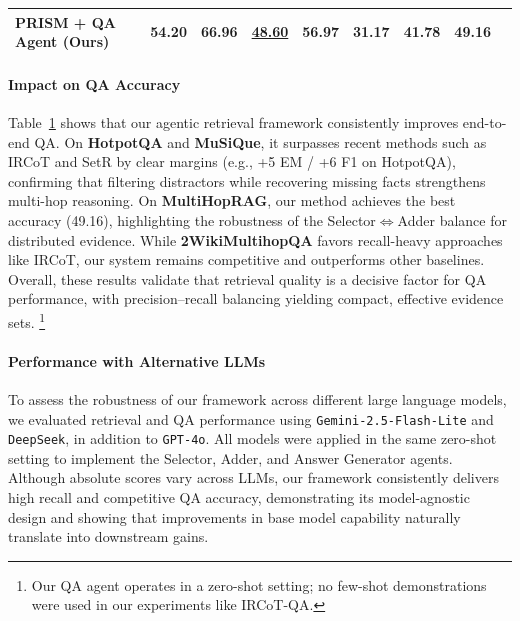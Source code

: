 \documentclass{article} %
\begin{document}
\begin{table}[ht]
\begin{tabular}{l|cc|cc|cc|cc}
\textbf{PRISM + QA Agent (Ours)} & \textbf{54.20} & \textbf{66.96} & \underline{48.60} & {56.97} & \textbf{31.17} & \textbf{41.78} & \textbf{49.16} \\
\bottomrule
\end{tabular}
\label{tab:qa}
\end{table}



\paragraph{Impact on QA Accuracy}

Table~\ref{tab:qa} shows that our agentic retrieval framework consistently improves end-to-end QA. On \textbf{HotpotQA} and \textbf{MuSiQue}, it surpasses recent methods such as IRCoT \citep{trivedi2023ircot} and SetR  \citep{lee-etal-2025-shifting} by clear margins (e.g., +5 EM / +6 F1 on HotpotQA), confirming that filtering distractors while recovering missing facts strengthens multi-hop reasoning. On \textbf{MultiHopRAG}, our method achieves the best accuracy (49.16), highlighting the robustness of the Selector$\Leftrightarrow$Adder balance for distributed evidence. While \textbf{2WikiMultihopQA} favors recall-heavy approaches like IRCoT, our system remains competitive and outperforms other baselines. Overall, these results validate that retrieval quality is a decisive factor for QA performance, with precision--recall balancing yielding compact, effective evidence sets. \footnote{Our QA agent operates in a zero-shot setting; no few-shot demonstrations were used in our experiments like IRCoT-QA. } 


\paragraph{Performance with Alternative LLMs}

To assess the robustness of our framework across different large language models, 
we evaluated retrieval and QA performance using \texttt{Gemini-2.5-Flash-Lite} and \texttt{DeepSeek}, 
in addition to \texttt{GPT-4o}. 
All models were applied in the same zero-shot setting to implement the Selector, Adder, and Answer Generator agents. 
Although absolute scores vary across LLMs, our framework consistently delivers high recall and competitive QA accuracy, 
demonstrating its model-agnostic design and showing that improvements in base model capability naturally translate into downstream gains.
\end{document}
